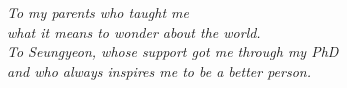 \chapter*{~}


\begin{center}                  %
\vspace*{3in}                   %
    \begin{onehalfspacing}      %
    \textit{
    To my parents who taught me\\
    what it means to wonder about the world.\\
    \bigskip
    To Seungyeon, whose support got me through my PhD\\
    and who always inspires me to be a better person.\\
    }
\end{onehalfspacing}
\end{center}